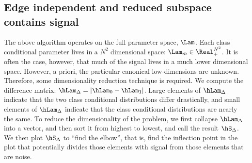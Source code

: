 \documentclass{article}
\begin{document}
% 
% 



\subsection{Edge independent and reduced subspace contains signal} %
\label{sub:edge_independent_and_reduced_subspace_contains_signal}

The above algorithm operates on the full parameter space, $\Lam$.  Each class conditional parameter lives in a $N^2$ dimensional space: $\Lam_m \in \Real_+^{N^2}$.  It is often the case, however, that much of the signal lives in a much lower dimensional space.  However, a priori, the particular canonical low-dimensions are unknown.  Therefore, some dimensionality reduction technique is required.  We compute the difference matrix: $\hLam_{\Delta}=|\hLam_0 - \hLam_1|$.  Large elements of $\hLam_{\Delta}$ indicate that the two class conditional distributions differ drastically, and small elements of $\hLam_{\Delta}$ indicate that the class conditional distributions are nearly the same.  To reduce the dimensionality of the problem, we first collapse $\hLam_{\Delta}$ into a vector, and then sort it from highest to lowest, and call the result $\hS_{\Delta}$.   We then plot $\hS_{\Delta}$ to ``find the elbow'', that is, find the inflection point in the plot that potentially divides those elements with signal from those elements that are noise.  
\end{document}
